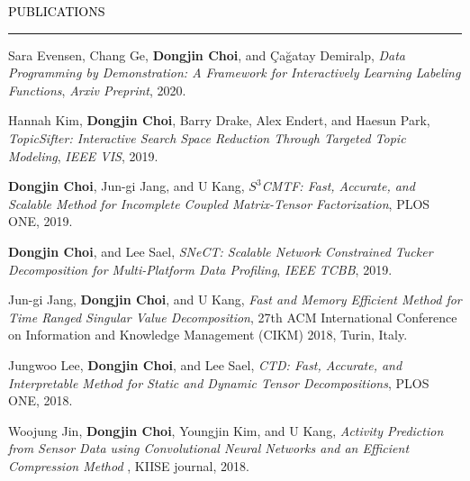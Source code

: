 \documentclass{resume} %
\renewenvironment{rSection}[1]{
	\sectionskip
	\textcolor{Black}{\MakeUppercase{#1}}
	\sectionlineskip
	\hrule
	\begin{list}{}{
			\setlength{\leftmargin}{1.5em}
		}
		\item[]
	}{
	\end{list}
}
\begin{document}
\begin{rSection}{Publications}
	\begin{rSubsection}{}{}{}{}
		\vspace*{-2.5mm}
		
		\item Sara Evensen, Chang Ge, \textbf{Dongjin Choi}, and Çağatay Demiralp, \textit{Data Programming by Demonstration: A Framework for Interactively Learning Labeling Functions}, \textit{Arxiv Preprint}, 2020.
		
		\item Hannah Kim, \textbf{Dongjin Choi}, Barry Drake, Alex Endert, and Haesun Park, \textit{TopicSifter: Interactive Search Space Reduction Through Targeted Topic Modeling}, \textit{IEEE VIS}, 2019.
		
		\item \textbf{Dongjin Choi}, Jun-gi Jang, and U Kang, \textit{$S^3$CMTF: Fast, Accurate, and Scalable Method for Incomplete Coupled Matrix-Tensor Factorization}, PLOS ONE, 2019.
		
		\item \textbf{Dongjin Choi}, and Lee Sael, \textit{SNeCT: Scalable Network Constrained Tucker Decomposition for Multi-Platform Data Profiling}, \textit{IEEE TCBB}, 2019.
		
		\item Jun-gi Jang, \textbf{Dongjin Choi}, and U Kang, \textit{Fast and Memory Efficient Method for Time Ranged Singular Value Decomposition}, 27th ACM International Conference on Information and Knowledge Management (CIKM) 2018, Turin, Italy.
		
		\item Jungwoo Lee, \textbf{Dongjin Choi}, and Lee Sael, \textit{CTD: Fast, Accurate, and Interpretable Method for Static and Dynamic Tensor Decompositions}, PLOS ONE, 2018.
		
		\item Woojung Jin, \textbf{Dongjin Choi}, Youngjin Kim, and U Kang, \textit{Activity Prediction from Sensor Data using Convolutional Neural Networks and an Efficient Compression Method }, KIISE journal, 2018.
		
	\end{rSubsection}
	
\end{rSection}
\vspace{-3mm}

\end{document}
